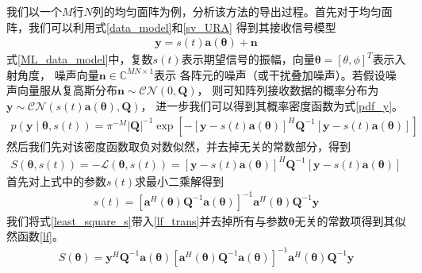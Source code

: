 \documentclass[master]{thesis-uestc}
\begin{document}
我们以一个$M$行$N$列的均匀面阵为例，分析该方法的导出过程。首先对于均匀面阵，我们可以利用式\eqref{data_model}和\eqref{sv_URA}
得到其接收信号模型
\begin{equation}\label{ML_data_model}
    \begin{aligned}
        \bm{y} = s(t)\bm{a}(\bm{\theta}) + \bm{n}
    \end{aligned}
\end{equation}
式\eqref{ML_data_model}中，复数$s(t)$表示期望信号的振幅，向量$\bm{\theta}=\left[\theta,\phi\right]^T$表示入射角度，
噪声向量$\bm{n}\in\mathbb{C}^{MN\times1}$表示
各阵元的噪声（或干扰叠加噪声）。若假设噪声向量服从复高斯分布$\bm{n}\sim\mathcal{CN}\left(0,\bm{Q}\right)$， 
则可知阵列接收数据的概率分布为$\bm{y}\sim\mathcal{CN}\left(s(t)\bm{a}(\bm{\theta}),\bm{Q}\right)$，
进一步我们可以得到其概率密度函数为式\eqref{pdf_y}。
\begin{equation}\label{pdf_y}
    \begin{aligned}
        p(\bm{y} \mid \bm{\theta}, s(t))=\pi^{-M}|\bm{Q}|^{-1} 
        \exp \left[-[\bm{y}-s(t) \bm{a}(\bm{\theta})]^{H} \bm{Q}^{-1}[\bm{y}-s(t) \bm{a}(\bm{\theta})]\right]
    \end{aligned}
\end{equation}
然后我们先对该密度函数取负对数似然，并去掉无关的常数部分，得到
\begin{equation}\label{lf_trans}
    \begin{aligned}
        S(\bm{\theta}, s(t))=-\mathcal{L}(\bm{\theta}, s(t))
        =[\bm{y}-s(t) \bm{a}(\bm{\theta})]^{H} \bm{Q}^{-1}[\bm{y}-s(t) \bm{a}(\bm{\theta})]
    \end{aligned}
\end{equation}
首先对上式中的参数$s(t)$求最小二乘解得到
\begin{equation}\label{least_square_s}
    \begin{aligned}
        s(t)=\left[\bm{a}^{H}(\bm{\theta}) \bm{Q}^{-1} \bm{a}(\bm{\theta})\right]^{-1} 
        \bm{a}^{H}(\bm{\theta}) \bm{Q}^{-1} \bm{y}
    \end{aligned}
\end{equation}
我们将式\eqref{least_square_s}带入\eqref{lf_trans}并去掉所有与参数$\bm{\theta}$无关的常数项得到其似然函数\eqref{lf}。
\begin{equation}\label{lf}
    \begin{aligned}
        S(\bm{\theta})=\bm{y}^{H} \bm{Q}^{-1} \bm{a}(\bm{\theta})
        \left[\bm{a}^{H}(\bm{\theta}) \bm{Q}^{-1} \bm{a}(\bm{\theta})\right]^{-1} 
        \bm{a}^{H}(\bm{\theta}) \bm{Q}^{-1} \bm{y}
    \end{aligned}
\end{equation}
\end{document}
